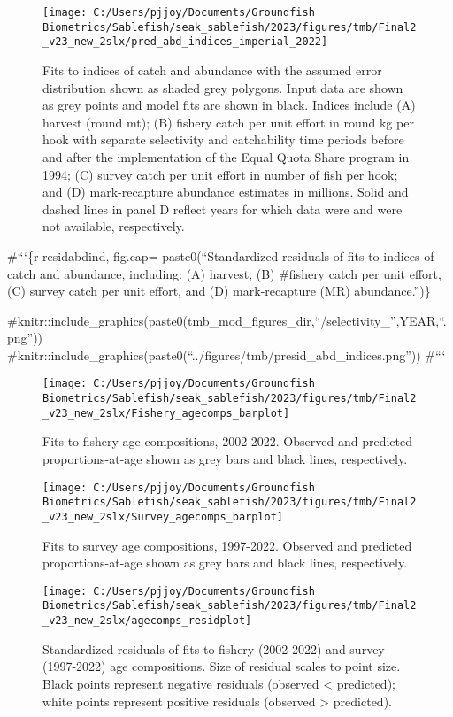 \documentclass[
]{article}
\begin{document}
\begin{figure}[H]
\texttt{[image: C:/Users/pjjoy/Documents/Groundfish Biometrics/Sablefish/seak\_sablefish/2023/figures/tmb/Final2\_v23\_new\_2slx/pred\_abd\_indices\_imperial\_2022]} \caption{Fits to indices of catch and abundance with the assumed error distribution shown as shaded grey polygons. Input data are shown as grey points and model fits are shown in black. Indices include (A) harvest (round mt); (B) fishery catch per unit effort in round kg per hook with separate selectivity and catchability time periods before and after the implementation of the Equal Quota Share program in 1994; (C) survey catch per unit effort in number of fish per hook; and (D) mark-recapture abundance estimates in millions. Solid and dashed lines in panel D reflect years for which data were and were not available, respectively.}\label{fig:predabdind}
\end{figure}

\#```\{r residabdind, fig.cap= paste0(``Standardized residuals of fits to indices of catch and abundance, including: (A) harvest, (B) \#fishery catch per unit effort, (C) survey catch per unit effort, and (D) mark-recapture (MR) abundance.'')\}

\#knitr::include\_graphics(paste0(tmb\_mod\_figures\_dir,``/selectivity\_'',YEAR,``.png''))
\#knitr::include\_graphics(paste0(``../figures/tmb/presid\_abd\_indices.png''))
\#```

\begin{figure}[H]
\texttt{[image: C:/Users/pjjoy/Documents/Groundfish Biometrics/Sablefish/seak\_sablefish/2023/figures/tmb/Final2\_v23\_new\_2slx/Fishery\_agecomps\_barplot]} \caption{Fits to fishery age compositions, 2002-2022. Observed and predicted proportions-at-age shown as grey bars and black lines, respectively.}\label{fig:fshage}
\end{figure}

\begin{figure}[H]
\texttt{[image: C:/Users/pjjoy/Documents/Groundfish Biometrics/Sablefish/seak\_sablefish/2023/figures/tmb/Final2\_v23\_new\_2slx/Survey\_agecomps\_barplot]} \caption{Fits to survey age compositions, 1997-2022. Observed and predicted proportions-at-age shown as grey bars and black lines, respectively.}\label{fig:srvage}
\end{figure}

\begin{figure}[H]
\texttt{[image: C:/Users/pjjoy/Documents/Groundfish Biometrics/Sablefish/seak\_sablefish/2023/figures/tmb/Final2\_v23\_new\_2slx/agecomps\_residplot]} \caption{Standardized residuals of fits to fishery (2002-2022) and survey (1997-2022) age compositions. Size of residual scales to point size. Black points represent negative residuals (observed < predicted); white points represent positive residuals (observed > predicted).}\label{fig:residage}
\end{figure}
\end{document}
